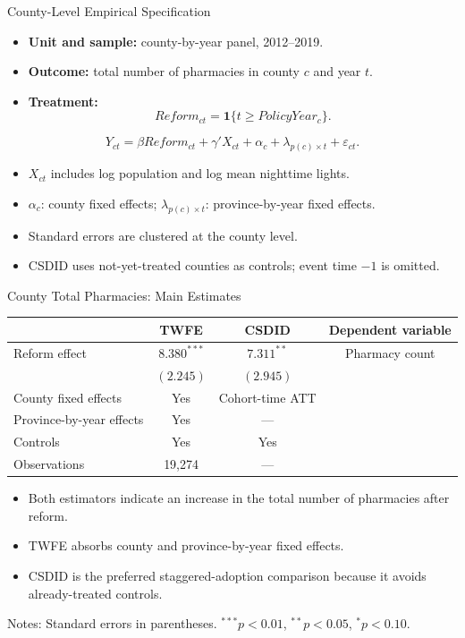 \documentclass{beamer}
\begin{document}
\begin{frame}{County-Level Empirical Specification}
\small
\begin{itemize}
  \item \textbf{Unit and sample:} county-by-year panel, 2012--2019.
  \item \textbf{Outcome:} total number of pharmacies in county $c$ and year $t$.
  \item \textbf{Treatment:}
  \[
    Reform_{ct}=\mathbf{1}\{t\geq PolicyYear_c\}.
  \]
\end{itemize}
\vspace{-0.4em}
\[
Y_{ct}=\beta Reform_{ct}+\gamma'X_{ct}
       +\alpha_c+\lambda_{p(c)\times t}+\varepsilon_{ct}.
\]
\begin{itemize}
  \item $X_{ct}$ includes log population and log mean nighttime lights.
  \item $\alpha_c$: county fixed effects; $\lambda_{p(c)\times t}$: province-by-year fixed effects.
  \item Standard errors are clustered at the county level.
  \item CSDID uses not-yet-treated counties as controls; event time $-1$ is omitted.
\end{itemize}
\end{frame}

\begin{frame}{County Total Pharmacies: Main Estimates}
\centering
\scriptsize
\begin{tabular}{lccc}
\toprule
 & TWFE & CSDID & Dependent variable \\
\midrule
Reform effect
  & $8.380^{***}$ & $7.311^{**}$ & Pharmacy count \\
  & $(2.245)$     & $(2.945)$    & \\
\midrule
County fixed effects       & Yes & Cohort-time ATT & \\
Province-by-year effects   & Yes & ---             & \\
Controls                   & Yes & Yes             & \\
Observations               & 19,274 & ---           & \\
\bottomrule
\end{tabular}

\vspace{1.0em}
\begin{itemize}
  \item Both estimators indicate an increase in the total number of pharmacies after reform.
  \item TWFE absorbs county and province-by-year fixed effects.
  \item CSDID is the preferred staggered-adoption comparison because it avoids already-treated controls.
\end{itemize}

\vfill
\tiny Notes: Standard errors in parentheses. $^{***}p<0.01$, $^{**}p<0.05$, $^{*}p<0.10$.
\end{frame}
\end{document}
